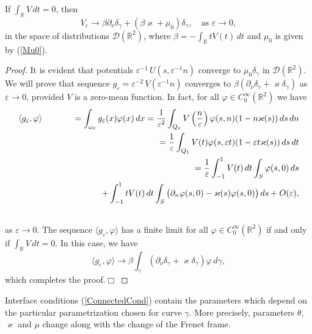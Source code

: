 \documentclass[graybox]{svmult}
\renewcommand{\kappa}{\varkappa}
\newcommand{\Real}{\mathbb R}
\newcommand{\eps}{\varepsilon}
\renewcommand{\phi}{\varphi}
\newcommand{\eqref}[1]{(\ref{#1})}
\begin{document}
\begin{proposition}\label{PropVepsConverg}
If $\int_\Real V\,dt=0$, then
$$
   V_\eps\to \beta\partial_\nu\delta_\gamma+\left(\beta\kappa+\mu_0\right) \delta_\gamma,\quad \mbox{as } \eps\to 0,
$$
in the space of distributions $\mathcal{D}(\Real^2)$, where
$\beta=-\int_\Real t V(t)\,dt$ and $\mu_0$ is given by \eqref{Mu0}.
\end{proposition}
\begin{proof}
It is evident that potentials $\eps^{-1}\,U\left(s,\eps^{-1}n\right)$
converge to $\mu_0 \delta_\gamma$ in $\mathcal{D}(\Real^2)$.
We will prove that sequence $g_\eps=\eps^{-2}\,V\left(\eps^{-1}n\right)$ converges to
$\beta\left(\partial_\nu\delta_\gamma+\kappa\delta_\gamma\right)$ as $\eps\to 0$, provided $V$ is a zero-mean function.
  In fact, for all $\phi\in C^\infty_0(\Real^2)$ we have
\begin{eqnarray}\nonumber
\langle g_\eps, \phi \rangle&&=\int_{\omega_\eps}g_\eps(x)\phi(x)\,dx
=
\frac{1}{\eps^2}\int_{Q_\eps} V\left(\frac{n}{\eps}\right)\phi(s,n)(1-n\kappa(s))\,ds\,dn
\\\nonumber
&& =
\frac{1}{\eps}\int_{Q_1} V(t)\phi(s,\eps t)(1-\eps t\kappa(s))\,ds\,dt
\\\nonumber
&&=\frac{1}{\eps}\int_{-1}^1 V(t)\,dt \int_S\phi(s,0)\,ds
\\\nonumber
&& \kern60pt
+
\int_{-1}^1 t V(t)\,dt \int_S\big(\partial_n\phi(s,0)-\kappa(s)\phi(s,0)\big)\,ds+O(\eps),
\\\nonumber
\end{eqnarray}
as $\eps\to 0$.
The sequence $\langle g_\eps, \phi \rangle$ has a finite limit for all $\phi\in C^\infty_0(\Real^2)$ if and only if $\int_\Real V\,dt=0$.
In this case, we have
$$
\langle g_\eps, \phi \rangle\to \beta\int_\gamma\left(\partial_\nu\delta_\gamma+\kappa \delta_\gamma\right)\phi\,d\gamma,
$$
which completes the proof.\hfill$\Box$
\end{proof}

Interface conditions \eqref{ConnectedCond} contain the parameters which depend on the particular parametrization chosen for curve $\gamma$. More precisely, parameters $\theta$, $\kappa$ and $\mu$ change along with the change of the Frenet frame.
\end{document}
